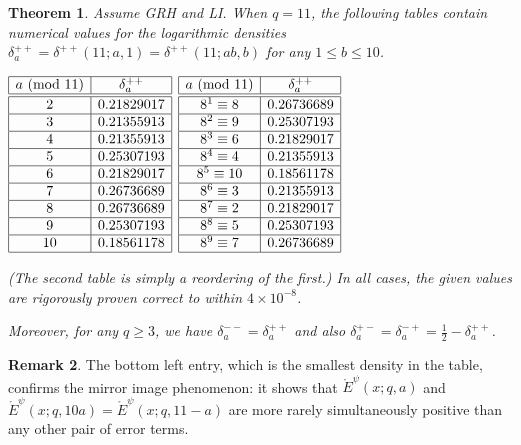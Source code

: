 \documentclass[11pt]{article}
\theoremstyle{plain}
\newtheorem{thm}{Theorem}[section]
\theoremstyle{definition}
\newtheorem{rem}[thm]{Remark}
\numberwithin{equation}{section}
\renewcommand{\mod}[1]{{\ifmmode\text{\rm\ (mod~$#1$)}\else\discretionary{}{}{\hbox{\!\!}}\rm(mod~$#1$)\fi}}
\newcommand{\Edot}{\mathord{\mathring E}}
\newcommand{\0}{{\vec 0}}
\begin{document}
\begin{thm}\label{mainthmshort}
Assume GRH and LI. When $q=11$, the following tables contain numerical values for the logarithmic densities $\delta_a^{++} = \delta^{++}(11;a,1) = \delta^{++}(11;ab,b)$ for any $1\le b\le10$.
\begin{center}
$\begin{array}{ |c|c| } 
\hline
a \mod{11} & \delta_a^{++} \\  \hline\hline
2 &0.21829017 \\ \hline
3 &0.21355913 \\ \hline
4 &0.21355913 \\ \hline
5 &0.25307193 \\ \hline
6 &0.21829017 \\ \hline
7 &0.26736689 \\ \hline
8 &0.26736689 \\ \hline
9 &0.25307193 \\ \hline
10&0.18561178 \\ \hline
\end{array}$
\qquad\qquad
$\begin{array}{ |c|c| } 
\hline
a \mod{11} & \delta_a^{++} \\  \hline\hline
8^1\equiv8 & 0.26736689 \\ \hline
8^2\equiv9 & 0.25307193 \\ \hline
8^3\equiv6 & 0.21829017 \\ \hline
8^4\equiv4 & 0.21355913 \\ \hline
8^5\equiv10 & 0.18561178 \\ \hline
8^6\equiv3 & 0.21355913 \\ \hline
8^7\equiv2 & 0.21829017 \\ \hline
8^8\equiv5 & 0.25307193 \\ \hline
8^9\equiv7 & 0.26736689 \\ \hline
\end{array}$
\end{center}
(The second table is simply a reordering of the first.)
In all cases, the given values are rigorously proven correct to within $4 \times10^{-8}$. 

Moreover, for any $q\ge3$, we have $\delta_a^{--}=\delta_a^{++}$ and also $\delta_a^{+-}=\delta_a^{-+}=\frac12-\delta_a^{++}$.
\end{thm}

\begin{rem}
The bottom left entry, which is the smallest density in the table, confirms the mirror image phenomenon: it shows that $\Edot^\psi(x;q,a)$ and $\Edot^\psi(x;q,10a) = \Edot^\psi(x;q,11-a)$ are more rarely simultaneously positive than any other pair of error terms.
\end{rem}
\end{document}
